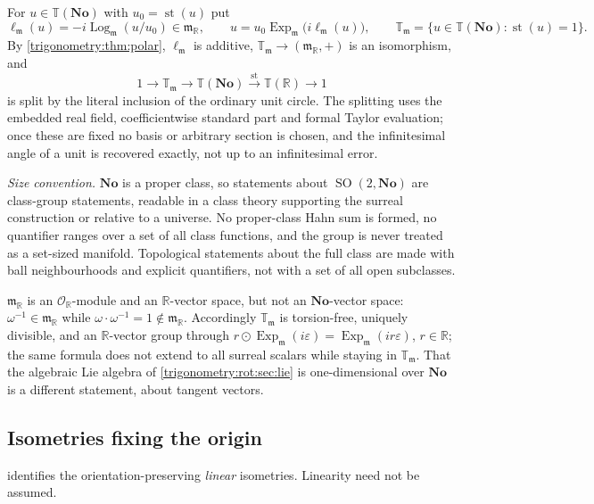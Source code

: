 \documentclass[11pt,letterpaper]{article}
\numberwithin{equation}{section}
\theoremstyle{definition}
\theoremstyle{remark}
\newcommand{\No}{\mathbf{No}}
\newcommand{\R}{\mathbb R}
\newcommand{\OO}{\mathcal O}
\newcommand{\mm}{\mathfrak m}
\newcommand{\TT}{\mathbb T}
\newcommand{\eps}{\varepsilon}
\newcommand{\st}{\operatorname{st}}
\newcommand{\Ex}{\operatorname{Exp}_{\mm}}
\newcommand{\Logm}{\operatorname{Log}_{\mm}}
\newcommand{\SO}{\operatorname{SO}}
\newcommand{\ellm}{\ell_{\mm}}
\newcommand{\Tm}{\TT_{\mm}}
\begin{document}
For $u\in\TT(\No)$ with $u_0=\st(u)$ put
\begin{equation}\label{trigonometry:rot:eq:ellm}
 \ellm(u)=-i\Logm(u/u_0)\in\mm_{\R},\qquad u=u_0\Ex\bigl(i\ellm(u)\bigr),\qquad
 \Tm=\{u\in\TT(\No):\st(u)=1\}.
\end{equation}
By \cref{trigonometry:thm:polar}, $\ellm$ is additive, $\Tm\to(\mm_{\R},+)$ is an isomorphism, and
\begin{equation}\label{trigonometry:rot:eq:exact}
 1\longrightarrow\Tm\longrightarrow\TT(\No)\xrightarrow{\ \st\ }\TT(\R)\longrightarrow1
\end{equation}
is split by the literal inclusion of the ordinary unit circle. The splitting uses the embedded real
field, coefficientwise standard part and formal Taylor evaluation; once these are fixed no basis or
arbitrary section is chosen, and the infinitesimal angle of a unit is recovered exactly, not up to
an infinitesimal error.

\emph{Size convention.} $\No$ is a proper class, so statements about $\SO(2,\No)$ are class-group
statements, readable in a class theory supporting the surreal construction or relative to a
universe. No proper-class Hahn sum is formed, no quantifier ranges over a set of all class
functions, and the group is never treated as a set-sized manifold. Topological statements about the
full class are made with ball neighbourhoods and explicit quantifiers, not with a set of all open
subclasses.

\begin{remark}\label{trigonometry:rot:rem:notvector}
$\mm_{\R}$ is an $\OO_{\R}$-module and an $\R$-vector space, but not an $\No$-vector space:
$\omega^{-1}\in\mm_{\R}$ while $\omega\cdot\omega^{-1}=1\notin\mm_{\R}$. Accordingly $\Tm$ is
torsion-free, uniquely divisible, and an $\R$-vector group through $r\odot\Ex(i\eps)=\Ex(ir\eps)$,
$r\in\R$; the same formula does not extend to all surreal scalars while staying in $\Tm$. That the
algebraic Lie algebra of \cref{trigonometry:rot:sec:lie} is one-dimensional over $\No$ is a different
statement, about tangent vectors.
\end{remark}

\subsection{Isometries fixing the origin}\label{trigonometry:rot:sec:isometry}
 identifies the orientation-preserving \emph{linear} isometries.
Linearity need not be assumed.
\end{document}
